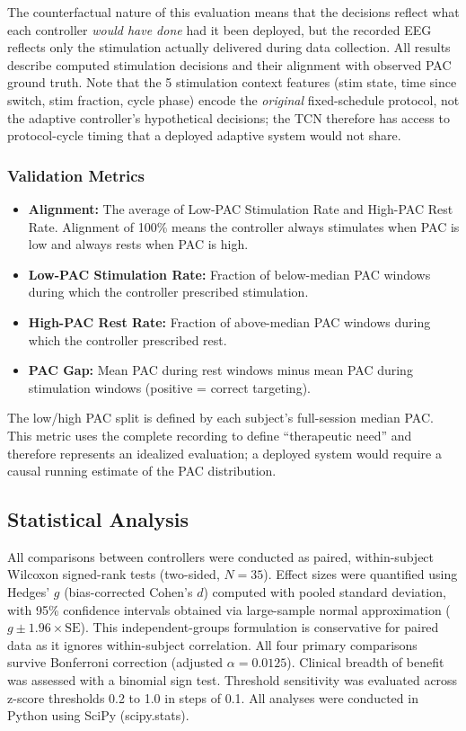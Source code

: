 \documentclass[11pt,letterpaper]{article}
\begin{document}
The counterfactual nature of this evaluation means that the decisions reflect what each controller \textit{would have done} had it been deployed, but the recorded EEG reflects only the stimulation actually delivered during data collection. All results describe computed stimulation decisions and their alignment with observed PAC ground truth. Note that the 5 stimulation context features (stim state, time since switch, stim fraction, cycle phase) encode the \textit{original} fixed-schedule protocol, not the adaptive controller's hypothetical decisions; the TCN therefore has access to protocol-cycle timing that a deployed adaptive system would not share.

\subsubsection{Validation Metrics}

\begin{itemize}[nosep]
  \item \textbf{Alignment:} The average of Low-PAC Stimulation Rate and High-PAC Rest Rate. Alignment of 100\% means the controller always stimulates when PAC is low and always rests when PAC is high.
  \item \textbf{Low-PAC Stimulation Rate:} Fraction of below-median PAC windows during which the controller prescribed stimulation.
  \item \textbf{High-PAC Rest Rate:} Fraction of above-median PAC windows during which the controller prescribed rest.
  \item \textbf{PAC Gap:} Mean PAC during rest windows minus mean PAC during stimulation windows (positive = correct targeting).
\end{itemize}

\noindent The low/high PAC split is defined by each subject's full-session median PAC. This metric uses the complete recording to define ``therapeutic need'' and therefore represents an idealized evaluation; a deployed system would require a causal running estimate of the PAC distribution.

\subsection{Statistical Analysis}

All comparisons between controllers were conducted as paired, within-subject Wilcoxon signed-rank tests (two-sided, $N = 35$). Effect sizes were quantified using Hedges' $g$ (bias-corrected Cohen's $d$) computed with pooled standard deviation, with 95\% confidence intervals obtained via large-sample normal approximation ($g \pm 1.96 \times \text{SE}$). This independent-groups formulation is conservative for paired data as it ignores within-subject correlation. All four primary comparisons survive Bonferroni correction (adjusted $\alpha = 0.0125$). Clinical breadth of benefit was assessed with a binomial sign test. Threshold sensitivity was evaluated across z-score thresholds 0.2 to 1.0 in steps of 0.1. All analyses were conducted in Python using SciPy (scipy.stats).
\end{document}
